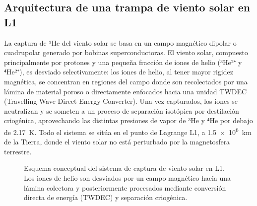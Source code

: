 \documentclass[11pt,a4paper]{article}
\begin{document}
\subsection{Arquitectura de una trampa de viento solar en L1}
La captura de ³He del viento solar se basa en un campo magnético dipolar o cuadrupolar generado por bobinas superconductoras. El viento solar, compuesto principalmente por protones y una pequeña fracción de iones de helio (³He²⁺ y ⁴He²⁺), es desviado selectivamente: los iones de helio, al tener mayor rigidez magnética, se concentran en regiones del campo donde son recolectados por una lámina de material poroso o directamente enfocados hacia una unidad TWDEC (Travelling Wave Direct Energy Converter). Una vez capturados, los iones se neutralizan y se someten a un proceso de separación isotópica por destilación criogénica, aprovechando las distintas presiones de vapor de ³He y ⁴He por debajo de \SI{2.17}{\kelvin}. Todo el sistema se sitúa en el punto de Lagrange L1, a \SI{1.5e6}{\kilo\metre} de la Tierra, donde el viento solar no está perturbado por la magnetosfera terrestre.
\begin{figure}[H]
\centering
{}
\caption{Esquema conceptual del sistema de captura de viento solar en L1. Los iones de helio son desviados por un campo magnético hacia una lámina colectora y posteriormente procesados mediante conversión directa de energía (TWDEC) y separación criogénica.}
\label{fig:L1_trap}
\end{figure}
\end{document}
